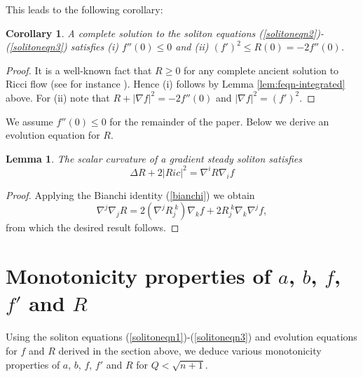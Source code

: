 \documentclass{amsart}
\newtheorem{lem}[thm]{Lemma}
\newtheorem{cor}[thm]{Corollary}
\theoremstyle{definition}
\theoremstyle{remark}
\numberwithin{equation}{section}
\begin{document}
This leads to the following corollary:

\begin{cor}
\label{cor:f-bounds}
A complete solution to the soliton equations (\ref{solitoneqn2})-(\ref{solitoneqn3}) satisfies (i) $f''(0) \leq 0$ and (ii) $(f')^2 \leq R(0) = -2 f''(0)$.
\end{cor}
\begin{proof}
It is a well-known fact that $R\geq0$ for any complete ancient solution to Ricci flow (see for instance \cite[Corollary 2.5]{Chen09}). Hence (i) follows by Lemma \ref{lem:feqn-integrated} above. For (ii) note that $R + |\nabla f|^2 = - 2 f''(0)$ and $|\nabla f|^2 = (f')^2$.
\end{proof}

We assume $f''(0) \leq 0$ for the remainder of the paper. Below we derive an evolution equation for $R$.
\begin{lem} The scalar curvature of a gradient steady soliton satisfies
 \begin{equation}
 \label{Reqn}
\Delta R + 2 |Ric|^2 = \nabla^i R \nabla_i f
 \end{equation}
\end{lem}
\begin{proof}
Applying the Bianchi identity (\ref{bianchi}) we obtain
 \begin{equation*}
 \nabla^j\nabla_j R = 2 \left( \nabla^j R_j^{\;k}\right)\nabla_k f + 2 R_j^{\;k} \nabla_k \nabla^j f,
 \end{equation*}
from which the desired result follows.
\end{proof}






\section{Monotonicity properties of $a$, $b$, $f$, $f'$ and $R$}
Using the soliton equations (\ref{solitoneqn1})-(\ref{solitoneqn3}) and evolution equations for $f$ and $R$ derived in the section above, we deduce various monotonicity properties of $a$, $b$, $f$, $f'$ and $R$ for $Q< \sqrt{n+1}$.
\end{document}

